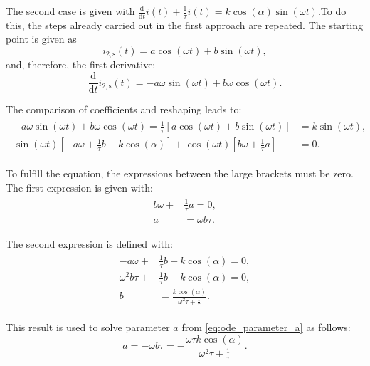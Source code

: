 \begin{solutionblock}
  The second case is given with $\frac{\mathrm{d}}{\mathrm{d}t}i(t) + \frac{1}{\tau}i(t) = k \cos(\alpha) \sin(\omega t)$.To do this, the steps already carried out in the first approach are repeated.
  The starting point is given as
  \begin{equation}
    i_{\mathrm{2,s}}(t) = a \cos(\omega t) + b \sin(\omega t),
  \end{equation}
  and, therefore, the first derivative:
  \begin{equation}
    \frac{\mathrm{d}}{\mathrm{d}t} i_{\mathrm{2,s}}(t) = - a \omega \sin(\omega t) + b \omega \cos(\omega t).
  \end{equation}

  The comparison of coefficients and reshaping leads to:
  \begin{align}
    \begin{split}
    -a \omega \sin(\omega t) + b \omega \cos(\omega t) = \frac{1}{\tau} \left[a \cos(\omega t) + b\sin(\omega t) \right] &= k \sin(\omega t), \\
    \sin(\omega t) \left[-a \omega + \frac{1}{\tau}b - k\cos(\alpha)\right] + \cos(\omega t) \left[b \omega + \frac{1}{\tau}a \right] &= 0.
    \end{split}
  \end{align}

  To fulfill the equation, the expressions between the large brackets must be zero. 
  The first expression is given with:
  \begin{align}
    \begin{split}
      b \omega + &\frac{1}{\tau}a =0, \\
      a &= \omega b \tau.
      \label{eq:ode_parameter_a}
    \end{split}
  \end{align}

  The second expression is defined with:
  \begin{align}
    \begin{split}
      -a \omega + &\frac{1}{\tau}b - k\cos(\alpha) = 0, \\
      \omega^2 b \tau + &\frac{1}{\tau}b - k \cos(\alpha) = 0, \\
      b &= \frac{k\cos(\alpha)}{\omega^2\tau+\frac{1}{\tau}}.
    \end{split}
  \end{align}

  This result is used to solve parameter $a$ from \eqref{eq:ode_parameter_a} as follows:
  \begin{equation}
    a = -\omega b \tau = -\frac{\omega \tau k \cos(\alpha)}{\omega^2\tau + \frac{1}{\tau}}.
  \end{equation}


\end{solutionblock}

